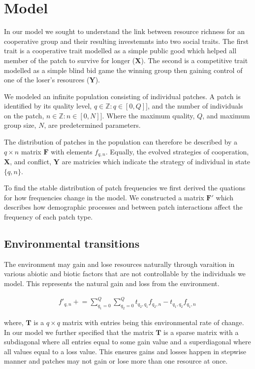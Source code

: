\section{Model}

In our model we sought to understand the link between resource richness for an cooperative group and their resulting investemnts into two social traits. The first trait is a cooperative trait modelled as a simple public good which helped all member of the patch to survive for longer ($\mathbf{X}$). The second is a competitive trait modelled as a simple blind bid game the winning group then gaining control of one of the loser's resources ($\mathbf{Y}$). 

We modeled an infinite population consisting of individual patches. A patch is identified by its quality level, $q \in \mathbb{Z} : q \in \left[ 0, Q \right]]$, and the number of individuals on the patch, $n \in \mathbb{Z} : n \in \left[ 0, N \right]]$. Where the maximum quality, $Q$, and maximum group size, $N$, are predetermined parameters. 

The distribution of patches in the population can therefore be described by a $q \times n$ matrix $\mathbf{F}$ with elements $f_{q,n}$. Equally, the evolved strategies of cooperation, $\mathbf{X}$, and conflict, $\mathbf{Y}$ are matricies which indicate the strategy of individual in state $\{q, n\}$. 

To find the stable distribution of patch frequencies we first derived the quations for how frequencies change in the model. We constructed a matrix $\mathbf{F}'$ which describes how demographic processes and between patch interactions affect the frequency of each patch type.

\subsection{Environmental transitions}
The environment may gain and lose resources naturally through varaition in various abiotic and biotic factors that are not controllable by the individuals we model. This represents the natural gain and loss from the environment.

\begin{align}
    f'_{q,n} \mathrel{+}= \sum^Q_{q_1=0} \sum^Q_{q_2=0}  t_{q_2, q_1} f_{q_2, n} - t_{q_1, q_2} f_{q_1, n} \,
\end{align}

where, $\mathbf{T}$ is a $q \times q$ matrix with entries being this environmental rate of change. In our model we further specified that the matrix $\mathbf{T}$ is a sparse matrix with a subdiagonal where all entries equal to some gain value and a superdiagonal where all values equal to a loss value. This ensures gains and losses happen in stepwise manner and patches may not gain or lose more than one resource at once.

